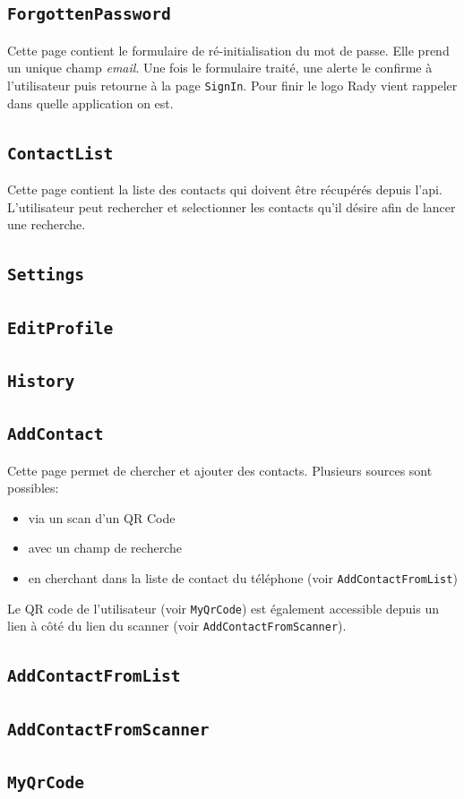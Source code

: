 \documentclass[french]{article}
\begin{document}
		\subsection{\texttt{ForgottenPassword}}
			Cette page contient le formulaire de ré-initialisation du mot de passe. Elle prend un unique champ \textit{email}. Une fois le formulaire traité, une alerte le confirme à l'utilisateur puis retourne à la page \texttt{SignIn}. Pour finir le logo Rady vient rappeler dans quelle application on est. 
			
		\subsection{\texttt{ContactList}}
			Cette page contient la liste des contacts qui doivent être récupérés depuis l'api. L'utilisateur peut rechercher et selectionner les contacts qu'il désire afin de lancer une recherche.
			
		\subsection{\texttt{Settings}}
			
		\subsection{\texttt{EditProfile}}
		
		\subsection{\texttt{History}}
			
		\subsection{\texttt{AddContact}}
			Cette page permet de chercher et ajouter des contacts. Plusieurs sources sont possibles: 
			\begin{itemize}
				\item via un scan d'un QR Code
				\item avec un champ de recherche
				\item en cherchant dans la liste de contact du téléphone (voir \texttt{AddContactFromList})
			\end{itemize}
		
			Le QR code de l'utilisateur (voir \texttt{MyQrCode}) est également accessible depuis un lien à côté du lien du scanner (voir \texttt{AddContactFromScanner}). 
			
		\subsection{\texttt{AddContactFromList}}
			
		\subsection{\texttt{AddContactFromScanner}}
			
		\subsection{\texttt{MyQrCode}}
		
		
			
\end{document}
